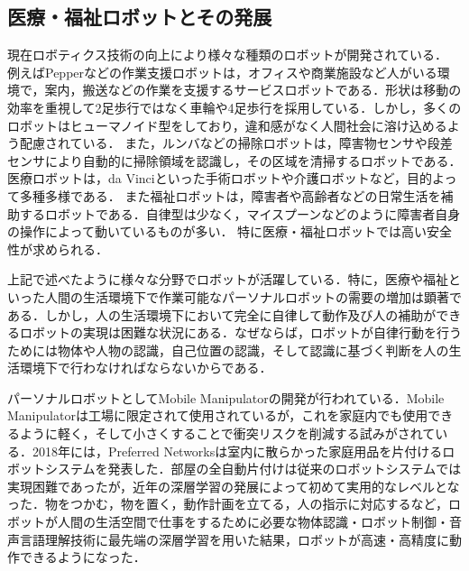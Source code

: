\subsection{医療・福祉ロボットとその発展}
現在ロボティクス技術の向上により様々な種類のロボットが開発されている．
例えばPepper\cite{pepper}などの作業支援ロボットは，オフィスや商業施設など人がいる環境で，案内，搬送などの作業を支援するサービスロボットである．形状は移動の効率を重視して2足歩行ではなく車輪や4足歩行を採用している．しかし，多くのロボットはヒューマノイド型をしており，違和感がなく人間社会に溶け込めるよう配慮されている．
また，ルンバ\cite{roomba}などの掃除ロボットは，障害物センサや段差センサにより自動的に掃除領域を認識し，その区域を清掃するロボットである．
医療ロボットは，da Vinci\cite{davinci}といった手術ロボットや介護ロボットなど，目的よって多種多様である．
また福祉ロボットは，障害者や高齢者などの日常生活を補助するロボットである．自律型は少なく，マイスプーン\cite{myspoon}などのように障害者自身の操作によって動いているものが多い．
特に医療・福祉ロボットでは高い安全性が求められる．


上記で述べたように様々な分野でロボットが活躍している．特に，医療や福祉といった人間の生活環境下で作業可能なパーソナルロボットの需要の増加は顕著である．しかし，人の生活環境下において完全に自律して動作及び人の補助ができるロボットの実現は困難な状況にある．なぜならば，ロボットが自律行動を行うためには物体や人物の認識，自己位置の認識，そして認識に基づく判断を人の生活環境下で行わなければならないからである．

パーソナルロボットとしてMobile Manipulatorの開発が行われている．Mobile Manipulatorは工場に限定されて使用されているが，これを家庭内でも使用できるように軽く，そして小さくすることで衝突リスクを削減する試みがされている．2018年には，Preferred Networksは室内に散らかった家庭用品を片付けるロボットシステムを発表した\cite{お片づけロボット}．部屋の全自動片付けは従来のロボットシステムでは実現困難であったが，近年の深層学習の発展によって初めて実用的なレベルとなった．物をつかむ，物を置く，動作計画を立てる，人の指示に対応するなど，ロボットが人間の生活空間で仕事をするために必要な物体認識・ロボット制御・音声言語理解技術に最先端の深層学習を用いた結果，ロボットが高速・高精度に動作できるようになった．

